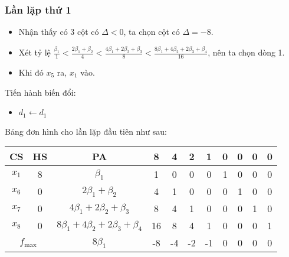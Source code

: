 \documentclass[12pt]{article}
\begin{document}
\subsubsection{Lần lặp thứ 1}
\begin{itemize}
\item Nhận thấy có 3 cột có $\Delta < 0$, ta chọn cột có $\Delta = -8$.
\item Xét tỷ lệ $\displaystyle \frac{\beta_1}{1} < \frac{2\beta_1 + \beta_2}{4} < \frac{4\beta_1 + 2\beta_2 + \beta_3}{8} < \frac{8\beta_1 + 4\beta_2 + 2\beta_3 + \beta_4}{16}$, nên ta chọn dòng 1.
\item Khi đó $x_5$ ra, $x_1$ vào.
\end{itemize}
Tiến hành biến đổi:
\begin{itemize}
\item $d_1 \leftarrow d_1$
\end{itemize}
Bảng đơn hình cho lần lặp đầu tiên như sau:
\begin{table}[H]
\centering
\begin{tabular}{|c|c|c|c|c|c|c|c|c|c|c|}
\hline
CS & HS & PA & 8 & 4 & 2 & 1 & 0 & 0 & 0 & 0 \\
\hline
$x_1$ & 8 & $\beta_1$ & 1 & 0 & 0 & 0 & 1 & 0 & 0 & 0 \\
$x_6$ & 0 & $2\beta_1 + \beta_2$ & 4 & 1 & 0 & 0 & 0 & 1 & 0 & 0 \\
$x_7$ & 0 & $4\beta_1 + 2\beta_2 + \beta_3$ & 8 & 4 & 1 & 0 & 0 & 0 & 1 & 0 \\
$x_8$ & 0 & $8\beta_1 + 4\beta_2 + 2\beta_3 + \beta_4$ & 16 & 8 & 4 & 1 & 0 & 0 & 0 & 1 \\
\hline
\multicolumn{2}{|c|}{$f_{\max}$}
& $8\beta_1$ & -8 & -4 & -2 & -1 & 0 & 0 & 0 & 0 \\
\hline
\end{tabular}
\end{table}

\cleardoublepage
{}
{}


\end{document}
